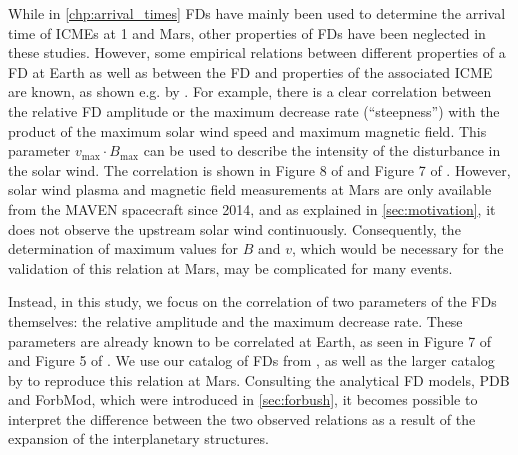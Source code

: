 While in \autoref{chp:arrival_times} \acp{FD} have mainly been used to determine the arrival time of \acp{ICME} at \SI{1}{\AU} and Mars, other properties of \acp{FD} have been neglected in these studies. However, some empirical relations between different properties of a \ac{FD} at Earth as well as between the \ac{FD} and properties of the associated \ac{ICME} are known, as shown e.g. by \citet{Belov-2008-FD,Abunin-2012-FD}. For example, there is a clear correlation between the relative \ac{FD} amplitude or the maximum decrease rate (``steepness'') with the product of the maximum solar wind speed and maximum magnetic field. This parameter $v_\text{max} \cdot B_\text{max}$ can be used to describe the intensity of the disturbance in the solar wind. The correlation is shown in Figure 8 of \citet{Belov-2008-FD} and Figure 7 of \citet{Abunin-2012-FD}.
However, solar wind plasma and magnetic field measurements at Mars are only available from the \ac{MAVEN} spacecraft since 2014, and as explained in \autoref{sec:motivation}, it does not observe the upstream solar wind continuously. Consequently, the determination of maximum values for $B$ and $v$, which would be necessary for the validation of this relation at Mars, may be complicated for many events.

Instead, in this study, we focus on the correlation of two parameters of the \acp{FD} themselves: the relative amplitude and the maximum decrease rate. These parameters are already known to be correlated at Earth, as seen in Figure 7 of \citet{Belov-2008-FD} and Figure 5 of \citet{Abunin-2012-FD}. We use our catalog of \acp{FD} from \citet{Forstner-2019}, as well as the larger catalog by \citet{Papaioannou-2019-FD-Earth-Mars} to reproduce this relation at Mars. Consulting the analytical \ac{FD} models, \acs{PDB} and \acs{ForbMod}, which were introduced in \autoref{sec:forbush}, it becomes possible to interpret the difference between the two observed relations as a result of the expansion of the interplanetary structures.

